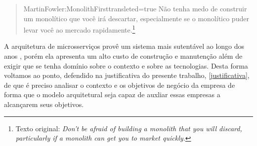 \begin{quotation}{MartinFowler:MonolithFirst}{transleted=true}
    Não tenha medo de construir um monolítico que você irá descartar, especialmente se o monolítico
    puder levar você ao mercado rapidamente.\footnote{Texto original: \textit{ Don't be afraid of
    building a monolith that you will discard, particularly if a monolith can get you to market quickly.}}
\end{quotation}

A arquitetura de microsserviços provê um sistema mais sutentável ao longo dos anos
\cite{Guido2016:WhyMicroservices}, porém ela apresenta um alto custo de construção e
manutenção além de exigir que se tenha domínio sobre o contexto e sobre as tecnologias. Desta forma
voltamos ao ponto, defendido na justificativa do presente trabalho, \autoref{justificativa}, de que é preciso analisar o
contexto e os objetivos de negócio da empresa de forma que o modelo arquitetural seja capaz de
auxliar essas empresas a alcançarem seus objetivos.
